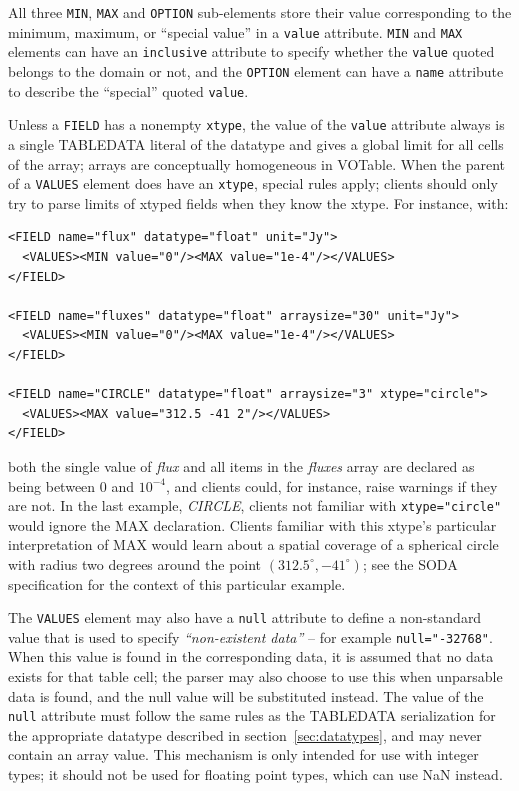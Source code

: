 \documentclass[11pt,a4paper]{ivoa}
\def\Aref#1{section~\ref{#1}}
\let\fg=\color
\def\attr#1{{\tt{\fg{DarkRed}#1}}}
\def\elem#1{{\tt{\fg{DarkRed}#1}}}
\def\attrval#1#2{{\tt{\fg{DarkRed}#1}="{\fg{DarkPurple}#2}"}}
\begin{document}
All three \elem{MIN}, \elem{MAX} and \elem{OPTION} sub-elements
store their value corresponding to the minimum, maximum, or ``special value''
in a \attr{value} attribute. \elem{MIN} and \elem{MAX} elements
can have an \attr{inclusive} attribute to specify whether the \attr{value}
quoted belongs to the domain or not, and the  \elem{OPTION} element
can have a \attr{name} attribute to describe the ``special'' quoted
\attr{value}.

Unless a \elem{FIELD} has a nonempty \attr{xtype}, the value of the
\attr{value} attribute always is a single TABLEDATA literal of
the datatype and gives a global limit for all cells of the array; arrays
are conceptually homogeneous in VOTable.  When the parent of a
\elem{VALUES} element does have an \attr{xtype}, special rules apply;
clients should only try to parse limits of xtyped fields when they know
the xtype.  For instance, with:

\begin{verbatim}
<FIELD name="flux" datatype="float" unit="Jy">
  <VALUES><MIN value="0"/><MAX value="1e-4"/></VALUES>
</FIELD>

<FIELD name="fluxes" datatype="float" arraysize="30" unit="Jy">
  <VALUES><MIN value="0"/><MAX value="1e-4"/></VALUES>
</FIELD>

<FIELD name="CIRCLE" datatype="float" arraysize="3" xtype="circle">
  <VALUES><MAX value="312.5 -41 2"/></VALUES>
</FIELD>
\end{verbatim}

\noindent both the single value of \emph{flux} and all items in the \emph{fluxes}
array are declared as being between 0 and $10^{-4}$, and clients could,
for instance, raise warnings if they are not.  In the last example,
\emph{CIRCLE}, clients not familiar with \attrval{xtype}{circle} would
ignore the MAX declaration.  Clients familiar with this xtype's
particular interpretation of MAX would learn about a spatial coverage of
a spherical circle with radius two degrees around the point
$(312.5^\circ,-41^\circ)$; see the SODA specification
\citep{2017ivoa.spec.0517B} for the context of this particular example.

The \elem{VALUES} element may also have a \attr{null} attribute
to define a non-standard value that is used to specify
{\em``non-existent data''} -- for example \attrval{null}{-32768}.
When this value is found in the corresponding data, it is assumed that no data
exists for that table cell; the parser may also choose to use this
when unparsable data is found, and the null value will be substituted
instead.
The value of the \attr{null} attribute must follow the same rules
as the TABLEDATA serialization for the appropriate datatype
described in \Aref{sec:datatypes},
and may never contain an array value.
This mechanism is only intended for use with integer types;
it should not be used for floating point types, which can use NaN instead.
\end{document}
